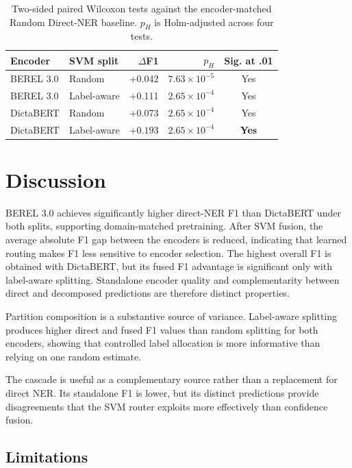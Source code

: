 \documentclass[conference,a4paper]{IEEEtran}
\begin{document}
\begin{table}[!t]
\centering
\caption{Two-sided paired Wilcoxon tests against the encoder-matched Random Direct-NER baseline. $p_H$ is Holm-adjusted across four tests.}
\label{tab:wilcoxon}
\scriptsize
\begin{tabular}{@{}llrrc@{}}
\toprule
Encoder & SVM split & $\Delta$F1 & $p_H$ & Sig. at .01 \\
\midrule
BEREL 3.0 & Random & +0.042 & $7.63\!\times\!10^{-5}$ & Yes \\
BEREL 3.0 & Label-aware & +0.111 & $2.65\!\times\!10^{-4}$ & Yes \\
DictaBERT & Random & +0.073 & $2.65\!\times\!10^{-4}$ & Yes \\
DictaBERT & Label-aware & $\mathbf{+0.193}$ & $2.65\!\times\!10^{-4}$ & \textbf{Yes} \\
\bottomrule
\end{tabular}
\end{table}

\section{Discussion}

BEREL 3.0 achieves significantly higher direct-NER F1 than DictaBERT under both splits, supporting domain-matched pretraining. After SVM fusion, the average absolute F1 gap between the encoders is reduced, indicating that learned routing makes F1 less sensitive to encoder selection. The highest overall F1 is obtained with DictaBERT, but its fused F1 advantage is significant only with label-aware splitting. Standalone encoder quality and complementarity between direct and decomposed predictions are therefore distinct properties.

Partition composition is a substantive source of variance. Label-aware splitting produces higher direct and fused F1 values than random splitting for both encoders, showing that controlled label allocation is more informative than relying on one random estimate.

The cascade is useful as a complementary source rather than a replacement for direct NER. Its standalone F1 is lower, but its distinct predictions provide disagreements that the SVM router exploits more effectively than confidence fusion.

\subsection{Limitations}
\end{document}
